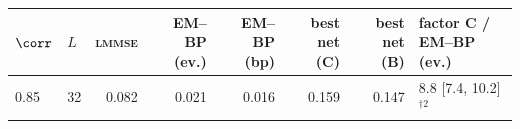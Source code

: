 \begin{tabular}{llrrrrrl}
\toprule
$\corr$ & $L$ & \textsc{lmmse} & EM--BP (ev.) & EM--BP (bp) & best net (C) & best net (B) & factor C / EM--BP (ev.) \\
\midrule
0.85 & 32 & 0.082 & 0.021 & 0.016 & 0.159 & 0.147 & $8.8$ [7.4, 10.2]$^{\dagger 2}$ \\
\bottomrule
\end{tabular}
